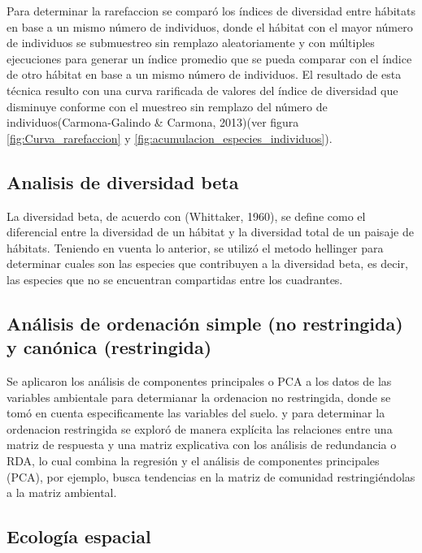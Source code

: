 \documentclass[11pt,]{article}
\begin{document}
Para determinar la rarefaccion se comparó los índices de diversidad
entre hábitats en base a un mismo número de individuos, donde el hábitat
con el mayor número de individuos se submuestreo sin remplazo
aleatoriamente y con múltiples ejecuciones para generar un índice
promedio que se pueda comparar con el índice de otro hábitat en base a
un mismo número de individuos. El resultado de esta técnica resulto con
una curva rarificada de valores del índice de diversidad que disminuye
conforme con el muestreo sin remplazo del número de
individuos(Carmona-Galindo \& Carmona, 2013)(ver figura
\ref{fig:Curva_rarefaccion} y
\ref{fig:acumulacion_especies_individuos}).

\subsection{Analisis de diversidad
beta}\label{analisis-de-diversidad-beta}

La diversidad beta, de acuerdo con (Whittaker, 1960), se define como el
diferencial entre la diversidad de un hábitat y la diversidad total de
un paisaje de hábitats. Teniendo en vuenta lo anterior, se utilizó el
metodo hellinger para determinar cuales son las especies que contribuyen
a la diversidad beta, es decir, las especies que no se encuentran
compartidas entre los cuadrantes.

\subsection{Análisis de ordenación simple (no restringida) y canónica
(restringida)}\label{anuxe1lisis-de-ordenaciuxf3n-simple-no-restringida-y-canuxf3nica-restringida}

Se aplicaron los análisis de componentes principales o PCA a los datos
de las variables ambientale para determianar la ordenacion no
restringida, donde se tomó en cuenta especificamente las variables del
suelo. y para determinar la ordenacion restringida se exploró de manera
explícita las relaciones entre una matriz de respuesta y una matriz
explicativa con los análisis de redundancia o RDA, lo cual combina la
regresión y el análisis de componentes principales (PCA), por ejemplo,
busca tendencias en la matriz de comunidad restringiéndolas a la matriz
ambiental.

\subsection{Ecología espacial}\label{ecologuxeda-espacial}
\end{document}
